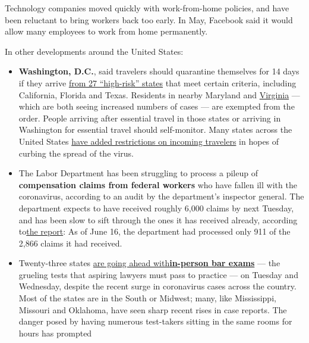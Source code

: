 Technology companies moved quickly with work-from-home policies, and
have been reluctant to bring workers back too early. In May, Facebook
said it would allow many employees to work from home permanently.

In other developments around the United States:

\begin{itemize}
\item
  \textbf{Washington, D.C.}, said travelers should quarantine themselves
  for 14 days if they arrive
  \href{https://coronavirus.dc.gov/release/dc-health-releases-list-high-risk-states}{from
  27 ``high-risk'' states} that meet certain criteria, including
  California, Florida and Texas. Residents in nearby Maryland and
  \href{https://www.nytimes.com/interactive/2020/us/virginia-coronavirus-cases.html}{Virginia}
  --- which are both seeing increased numbers of cases --- are exempted
  from the order. People arriving after essential travel in those states
  or arriving in Washington for essential travel should self-monitor.
  Many states across the United States
  \href{https://www.nytimes.com/2020/07/10/travel/state-travel-restrictions.html}{have
  added restrictions on incoming travelers} in hopes of curbing the
  spread of the virus.
\item
  The Labor Department has been struggling to process a pileup of
  \textbf{compensation claims from federal workers} who have fallen ill
  with the coronavirus, according to an audit by the department's
  inspector general. The department expects to have received roughly
  6,000 claims by next Tuesday, and has been slow to sift through the
  ones it has received already, according
  to\href{https://www.oig.dol.gov/public/reports/oa/2020/19-20-004-04-001.pdf}{the
  report}: As of June 16, the department had processed only 911 of the
  2,866 claims it had received.
\item
  Twenty-three states
  \href{http://www.ncbex.org/ncbe-covid-19-updates/july-2020-bar-exam-jurisdiction-information/status-table/}{are
  going ahead
  with}\textbf{\href{http://www.ncbex.org/ncbe-covid-19-updates/july-2020-bar-exam-jurisdiction-information/status-table/}{in-person
  bar exams}} --- the grueling tests that aspiring lawyers must pass to
  practice --- on Tuesday and Wednesday, despite the recent surge in
  coronavirus cases across the country. Most of the states are in the
  South or Midwest; many, like Mississippi, Missouri and Oklahoma, have
  seen sharp recent rises in case reports. The danger posed by having
  numerous test-takers sitting in the same rooms for hours has prompted

\end{itemize}
